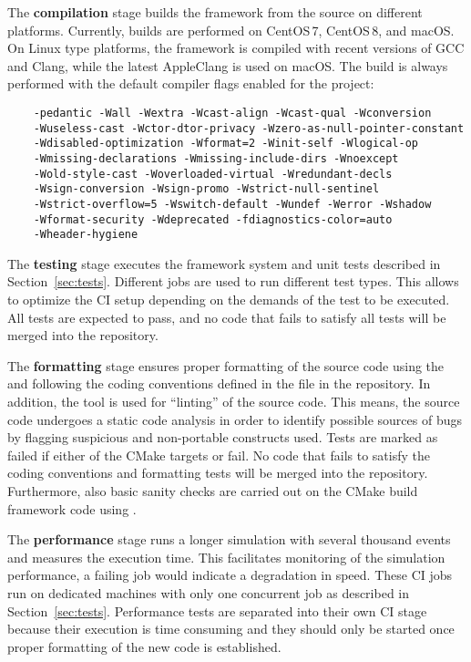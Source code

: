 The \textbf{compilation} stage builds the framework from the source on different platforms.
Currently, builds are performed on CentOS\,7, CentOS\,8, and macOS.
On Linux type platforms, the framework is compiled with recent versions of GCC and Clang, while the latest AppleClang is used on macOS.
The build is always performed with the default compiler flags enabled for the project:
\begin{verbatim}
    -pedantic -Wall -Wextra -Wcast-align -Wcast-qual -Wconversion
    -Wuseless-cast -Wctor-dtor-privacy -Wzero-as-null-pointer-constant
    -Wdisabled-optimization -Wformat=2 -Winit-self -Wlogical-op
    -Wmissing-declarations -Wmissing-include-dirs -Wnoexcept
    -Wold-style-cast -Woverloaded-virtual -Wredundant-decls
    -Wsign-conversion -Wsign-promo -Wstrict-null-sentinel
    -Wstrict-overflow=5 -Wswitch-default -Wundef -Werror -Wshadow
    -Wformat-security -Wdeprecated -fdiagnostics-color=auto
    -Wheader-hygiene
\end{verbatim}

The \textbf{testing} stage executes the framework system and unit tests described in Section~\ref{sec:tests}.
Different jobs are used to run different test types.
This allows to optimize the CI setup depending on the demands of the test to be executed.
All tests are expected to pass, and no code that fails to satisfy all tests will be merged into the repository.

The \textbf{formatting} stage ensures proper formatting of the source code using the  and following the coding conventions defined in the  file in the repository.
In addition, the  tool is used for ``linting'' of the source code.
This means, the source code undergoes a static code analysis in order to identify possible sources of bugs by flagging suspicious and non-portable constructs used.
Tests are marked as failed if either of the CMake targets  or  fail.
No code that fails to satisfy the coding conventions and formatting tests will be merged into the repository.
Furthermore, also basic sanity checks are carried out on the CMake build framework code using .

The \textbf{performance} stage runs a longer simulation with several thousand events and measures the execution time.
This facilitates monitoring of the simulation performance, a failing job would indicate a degradation in speed.
These CI jobs run on dedicated machines with only one concurrent job as described in Section~\ref{sec:tests}.
Performance tests are separated into their own CI stage because their execution is time consuming and they should only be started once proper  formatting of the new code is established.


